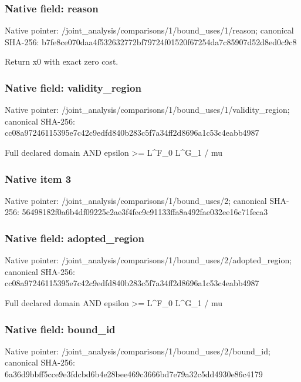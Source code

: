 \documentclass[10pt,a4paper]{article}
\begin{document}
\subsubsection{Native field: reason}
Native pointer: /joint\_\allowbreak{}analysis/comparisons/1/bound\_\allowbreak{}uses/1/reason; canonical SHA-256: b7fe8ce070daa4f532632772bf79724f01520f67254da7c85907d52d8ed0c9c8

\begingroup\raggedright\sloppy Return x0 with exact zero cost.\par\endgroup

\subsubsection{Native field: validity\_\allowbreak{}region}
Native pointer: /joint\_\allowbreak{}analysis/comparisons/1/bound\_\allowbreak{}uses/1/validity\_\allowbreak{}region; canonical SHA-256: cc08a97246115395e7c42c9edfd840b283c5f7a34ff2d8696a1c53c4eabb4987

\begingroup\raggedright\sloppy Full declared domain AND epsilon >=\allowbreak{} L\textasciicircum{}F\_\allowbreak{}0 L\textasciicircum{}G\_\allowbreak{}1 /\allowbreak{} mu\par\endgroup

\subsubsection{Native item 3}
Native pointer: /joint\_\allowbreak{}analysis/comparisons/1/bound\_\allowbreak{}uses/2; canonical SHA-256: 56498182f0a6b4df09225c2ae3f4fec9c91133ffa8a492fae032ee16c71feca3

\subsubsection{Native field: adopted\_\allowbreak{}region}
Native pointer: /joint\_\allowbreak{}analysis/comparisons/1/bound\_\allowbreak{}uses/2/adopted\_\allowbreak{}region; canonical SHA-256: cc08a97246115395e7c42c9edfd840b283c5f7a34ff2d8696a1c53c4eabb4987

\begingroup\raggedright\sloppy Full declared domain AND epsilon >=\allowbreak{} L\textasciicircum{}F\_\allowbreak{}0 L\textasciicircum{}G\_\allowbreak{}1 /\allowbreak{} mu\par\endgroup

\subsubsection{Native field: bound\_\allowbreak{}id}
Native pointer: /joint\_\allowbreak{}analysis/comparisons/1/bound\_\allowbreak{}uses/2/bound\_\allowbreak{}id; canonical SHA-256: 6a36d9bbff5cce9e3fdcbd6b4e28bee469c3666bd7e79a32c5dd4930e86c4179
\end{document}
